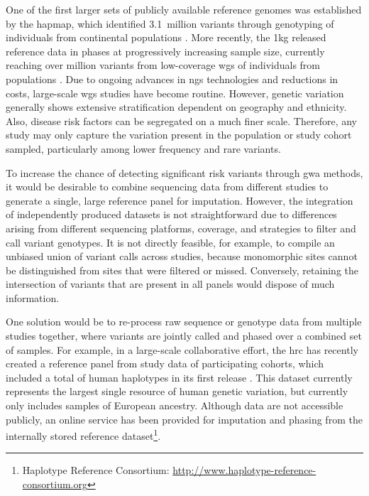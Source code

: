 One of the first larger sets of publicly available reference genomes was established by the \gls{hapmap}, which identified 3.1~million variants through genotyping of  individuals from  continental populations \citep{Frazer:2007kha, InternationalHapMapConsortium:2010en}.
More recently, the \gls{1kg} released reference data in  phases at progressively increasing sample size, currently reaching over  million variants from low-coverage \gls{wgs} of  individuals from  populations \citep{GenomesProjectConsortium:2012co, Auton:2015gk}.
Due to ongoing advances in \gls{ngs} technologies and reductions in costs, large-scale \gls{wgs} studies have become routine.
However, genetic variation generally shows extensive stratification dependent on geography and ethnicity.
Also, disease risk factors can be segregated on a much finer scale.
Therefore, any study may only capture the variation present in the population or study cohort sampled, particularly among lower frequency and rare variants.

To increase the chance of detecting significant risk variants through \gls{gwa} methods, it would be desirable to combine sequencing data from different studies to generate a single, large reference panel for imputation.
However, the integration of independently produced datasets is not straightforward due to differences arising from different sequencing platforms, coverage, and strategies to filter and call variant genotypes.
It is not directly feasible, for example, to compile an unbiased union of variant calls across studies, because monomorphic sites cannot be distinguished from sites that were filtered or missed.
Conversely, retaining the intersection of variants that are present in all panels would dispose of much information.

One solution would be to re-process raw sequence or genotype data from multiple studies together, where variants are jointly called and phased over a combined set of samples.
For example, in a large-scale collaborative effort, the \gls{hrc} has recently created a reference panel from study data of  participating cohorts, which included a total of  human haplotypes in its first release \citep{McCarthy:2016gs}.
This dataset currently represents the largest single resource of human genetic variation, but currently only includes samples of European ancestry.
Although data are not accessible publicly, an online service has been provided for imputation and phasing from the internally stored reference dataset\footnote{Haplotype Reference Consortium: \url{http://www.haplotype-reference-consortium.org} }.

